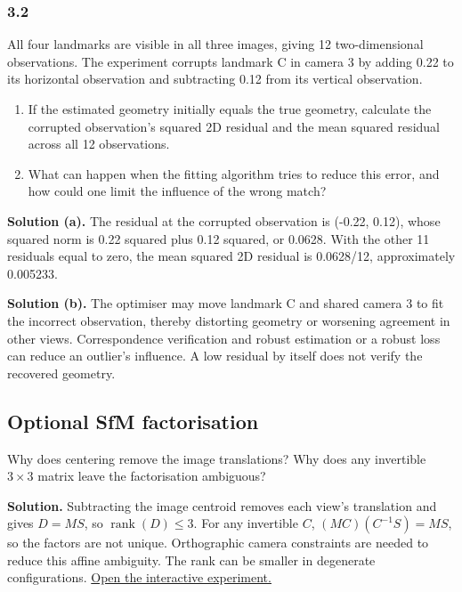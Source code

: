\documentclass[11pt,a4paper]{article}
\begin{document}
\par\medskip
\par
\noindent
\begin{minipage}{\linewidth}
\subsubsection*{3.2}
All four landmarks are visible in all three images, giving 12 two-dimensional observations.
The experiment corrupts landmark C in camera 3 by adding 0.22 to its horizontal observation and subtracting 0.12 from its vertical observation.
\begin{enumerate}[label=(\alph*),nosep]
\item If the estimated geometry initially equals the true geometry, calculate the corrupted observation's squared 2D residual and the mean squared residual across all 12 observations.
\item What can happen when the fitting algorithm tries to reduce this error, and how could one limit the influence of the wrong match?
\end{enumerate}
\noindent\textbf{Solution (a).} The residual at the corrupted observation is (-0.22, 0.12), whose squared norm is 0.22 squared plus 0.12 squared, or 0.0628.
With the other 11 residuals equal to zero, the mean squared 2D residual is 0.0628/12, approximately 0.005233.

\noindent\textbf{Solution (b).} The optimiser may move landmark C and shared camera 3 to fit the incorrect observation, thereby distorting geometry or worsening agreement in other views.
Correspondence verification and robust estimation or a robust loss can reduce an outlier's influence.
A low residual by itself does not verify the recovered geometry.
\end{minipage}
\par\medskip
\subsection*{Optional SfM factorisation}
Why does centering remove the image translations?
Why does any invertible $3\times 3$ matrix leave the factorisation ambiguous?

\noindent\textbf{Solution.} Subtracting the image centroid removes each view's translation and gives $D=MS$, so $\operatorname{rank}(D)\leq 3$.
For any invertible $C$, $(MC)(C^{-1}S)=MS$, so the factors are not unique.
Orthographic camera constraints are needed to reduce this affine ambiguity.
The rank can be smaller in degenerate configurations.
\noindent\href{https://sosekie.github.io/Unibe-CVG-CV-Interactive-Labs/tutorial-10/#sfm}{Open the interactive experiment.}
\end{document}
